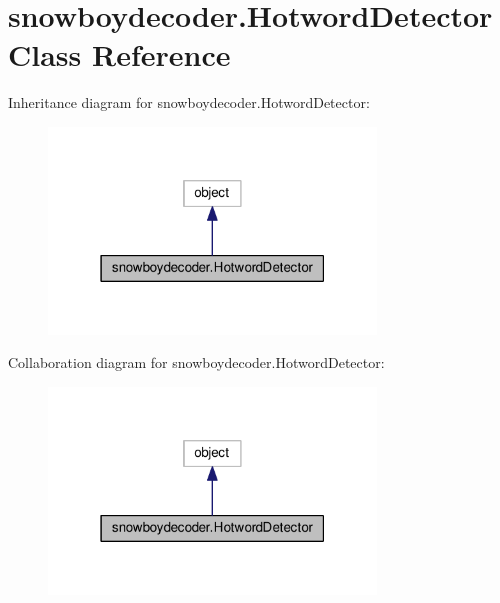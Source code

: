 \hypertarget{classsnowboydecoder_1_1HotwordDetector}{}\section{snowboydecoder.\+Hotword\+Detector Class Reference}
\label{classsnowboydecoder_1_1HotwordDetector}


Inheritance diagram for snowboydecoder.\+Hotword\+Detector\+:
\nopagebreak
\begin{figure}[H]
\begin{center}
\leavevmode
\includegraphics[width=247pt]{classsnowboydecoder_1_1HotwordDetector__inherit__graph}
\end{center}
\end{figure}


Collaboration diagram for snowboydecoder.\+Hotword\+Detector\+:
\nopagebreak
\begin{figure}[H]
\begin{center}
\leavevmode
\includegraphics[width=247pt]{classsnowboydecoder_1_1HotwordDetector__coll__graph}
\end{center}
\end{figure}
